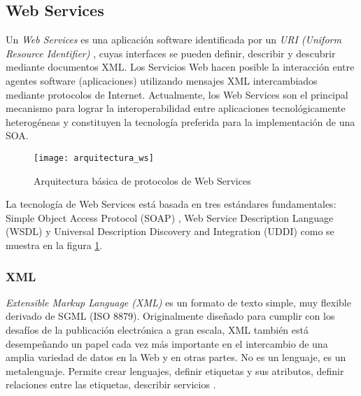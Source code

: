 \subsection{Web Services }
\label{MarcoConceptual:WS}
Un \emph{Web Services} es una aplicación software identificada por un \emph{URI (Uniform Resource Identifier)} \cite{WS:definiciones}, cuyas interfaces se pueden definir, describir y descubrir mediante documentos XML. Los Servicios Web hacen posible la interacción entre agentes software (aplicaciones) utilizando mensajes XML intercambiados mediante protocolos de Internet.
Actualmente, los Web Services son el principal mecanismo para lograr la interoperabilidad
entre aplicaciones tecnológicamente heterogéneas y constituyen la tecnología preferida para
la implementación de una SOA\cite{WS:definiciones}.
  \begin{figure}[h]
    \centering
    \texttt{[image: arquitectura\_ws]}
    \caption{Arquitectura básica de protocolos de Web Services}
    \label{figura:arquitectura_ws}
  \end{figure}
La tecnología de Web Services está basada en tres estándares fundamentales: Simple Object
Access Protocol (SOAP) , Web Service Description Language (WSDL) y Universal
Description Discovery and Integration (UDDI) como se muestra en la figura \ref{figura:arquitectura_ws}.
\subsubsection{XML}
\label{MarcoConceptual:XML}
\emph{Extensible Markup Language (XML)} es un formato de texto simple, muy flexible derivado de SGML (ISO 8879). Originalmente diseñado para cumplir con los desafíos de la publicación electrónica a gran escala, XML también está desempeñando un papel cada vez más importante en el intercambio de una amplia variedad de datos en la Web y en otras partes. No es un lenguaje, es un metalenguaje. Permite crear lenguajes, definir etiquetas y sus atributos, definir relaciones entre las etiquetas, describir servicios \cite{XSLT:definiciones,XML:W3C}.

